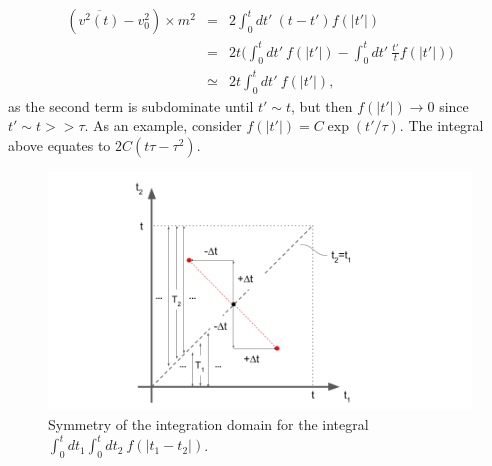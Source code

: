 \begin{eqnarray}
(\overline{v^2(t)}-v_0^2) \times m^2 &=& 2 \int_{0}^{t} dt'~ (t-t')f(|t'|) \\
&=& 2 t \bigg( \int_{0}^{t} dt'~ f(|t'|) - \int_{0}^{t} dt'~ \frac{t'}{t} f(|t'|)\bigg)\\
& \simeq & 2t \int_{0}^{t} dt'~ f(|t'|),
\end{eqnarray}
as the second term is subdominate until $t'\sim t$, but then $f(|t'|) \rightarrow 0$ since $t'\sim t>>\tau$. As an example, consider $f(|t'|)=C \exp(t'/\tau)$. The integral above equates to $2C(t \tau - \tau^2)$.
\begin{figure}[h]
\includegraphics[width=16cm]{fig_problem_3p3.png}
    \caption{Symmetry of the integration domain for the integral $ \int_{0}^{t} dt_1 \int_{0}^{t} dt_2 ~ f(|t_1-t_2|)$.}
    \label{fig:3p3}
\end{figure}